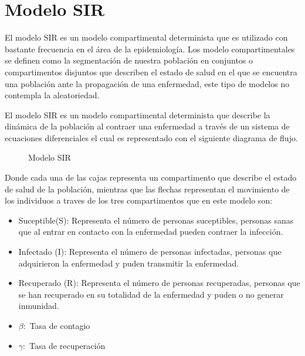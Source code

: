 \chapter{\textbf{Modelo SIR}}

El modelo SIR es un modelo compartimental determinista que es utilizado con bastante frecuencia en el área de la epidemiología. Los modelo compartimentales se definen como la segmentación de nuestra población en conjuntos o compartimentos disjuntos que describen el estado de salud en el que se encuentra una población ante la propagación de una enfermedad, este tipo de modelos no contempla la aleatoriedad.

El modelo SIR es un modelo compartimental determinista que describe la dinámica de la población al contraer una enfermedad a través de un sistema de ecuaciones diferenciales el cual es representado con el siguiente diagrama de flujo.

\begin{figure}[h]
\centering
{}
\caption{Modelo SIR} \label{fig:1.1}
\end{figure}	

Donde cada una de las cajas representa un compartimento que describe el estado de salud de la población, mientras que las flechas representan el movimiento de los individuos a traves de los tres compartimentos que en este modelo son:

\begin{itemize}
\item Suceptible(S): Representa el número de personas suceptibles, personas sanas que al entrar en contacto con la enfermedad pueden contraer la infección.

\item Infectado (I): Representa el número de personas infectadas, personas que adquirieron la enfermedad y puden transmitir la enfermedad.

\item Recuperado (R): Representa el número de personas recuperadas, personas que se han recuperado en su totalidad de la enfermedad y puden o no generar inmunidad.

\item \textbf{$\beta:$} Tasa de contagio

\item \textbf{$\gamma:$} Tasa de recuperación

\end{itemize}

